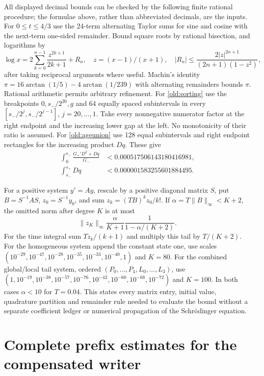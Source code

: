 \documentclass[11pt]{article}
\theoremstyle{definition}\newtheorem{definition}[theorem]{Definition}
\theoremstyle{remark}\newtheorem{remark}[theorem]{Remark}
\begin{document}
All displayed decimal bounds can be checked by the following finite
rational procedure; the formulae above, rather than abbreviated decimals,
are the inputs. For $0\leq t\leq4/3$ use the 24-term alternating Taylor
sums for sine and cosine with the next-term one-sided remainder. Bound
square roots by rational bisection, and logarithms by
\[
 \log x=2\sum_{k=0}^{n-1}\frac{z^{2k+1}}{2k+1}+R_n,
 \quad z=(x-1)/(x+1),\quad
 |R_n|\leq\frac{2|z|^{2n+1}}{(2n+1)(1-z^2)},
\]
after taking reciprocal arguments where useful. Machin's identity
$\pi=16\arctan(1/5)-4\arctan(1/239)$ with alternating remainders
bounds $\pi$. Rational arithmetic permits arbitrary refinement.
For \eqref{old:sorting} use the breakpoints $0,s_-/2^{20},g$ and
64 equally spaced subintervals in every
$[s_-/2^j,s_-/2^{j-1}]$, $j=20,\ldots,1$.
Take every nonnegative numerator factor at the right endpoint and the
increasing lower gap at the left. No monotonicity of their ratio is
assumed. For \eqref{old:ageunion} use 128 equal subintervals and right
endpoint rectangles for the increasing product $Dq$.
These give
\begin{align*}
 \int_0^{s_-}\frac{G_+'D^2+Dq}{G_-}
       &<0.000517506143180416981,\\
 \int_{s_-}^{s_+}Dq&<0.000001583255601884495.
\end{align*}

For a positive system $y'=Ay$, rescale by a positive diagonal matrix
$S$, put $B=S^{-1}AS$, $z_0=S^{-1}y_0$, and sum
$z_k=(TB)^kz_0/k!$.
If $\alpha=T\|B\|_\infty<K+2$, the omitted norm after degree $K$
is at most
\[
 \|z_K\|_\infty\frac{\alpha}{K+1}
                     \frac1{1-\alpha/(K+2)}.
\]
For the time integral sum $Tz_k/(k+1)$ and multiply this tail by
$T/(K+2)$. For the homogeneous system append the constant state one,
use scales
$(10^{-29},10^{-47},10^{-28},10^{-35},10^{-33},10^{-40},1)$
and $K=80$. For the combined global/local tail system, ordered
$(P_0,\ldots,P_4,L_0,\ldots,L_3)$, use
$(1,10^{-19},10^{-38},10^{-57},10^{-76},10^{-42},10^{-60},10^{-68},10^{-72})$
and $K=100$. In both cases $\alpha<10$ for $T=0.04$.
This states every matrix entry, initial value, quadrature partition and
remainder rule needed to evaluate the bound without a separate
coefficient ledger or numerical propagation of the Schr\"odinger equation.


\section{Complete prefix estimates for the compensated writer}
\label{prefix:appendix}\label{prefix:main}
\end{document}
